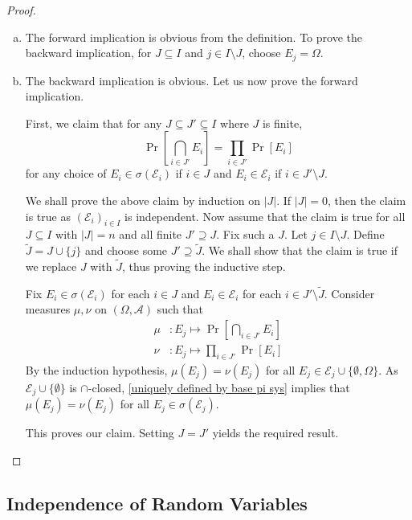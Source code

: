 \begin{proof}
    ~
    \begin{enumerate}[(a)]
        \item The forward implication is obvious from the definition. To prove the backward implication, for $J\subseteq I$ and $j\in I\setminus J$, choose $E_j=\Omega$.
        
        \item The backward implication is obvious. Let us now prove the forward implication.
        
        First, we claim that for any $J\subseteq J'\subseteq I$ where $J$ is finite, 
        $$\Pr\left[\bigcap_{i\in J'}E_i\right] = \prod_{i\in J'}\Pr[E_i]$$
        for any choice of $E_i\in\sigma(\mathcal{E}_i)$ if $i\in J$ and
        $E_i\in\mathcal{E}_i$ if $i\in J'\setminus J$.
        
        We shall prove the above claim by induction on $|J|$. If $|J|=0$, then the claim is true as $(\mathcal{E}_i)_{i\in I}$ is independent. Now assume that the claim is true for all $J\subseteq I$ with $|J|=n$ and all finite $J'\supseteq J$. Fix such a $J$. Let $j\in I\setminus J$. Define $\tilde J=J\cup\{j\}$ and choose some $J'\supseteq\tilde J$. We shall show that the claim is true if we replace $J$ with $\tilde J$, thus proving the inductive step.
    
        Fix $E_i\in\sigma(\mathcal{E}_i)$ for each $i\in J$ and $E_i\in\mathcal{E}_i$ for each $i\in J'\setminus\tilde J$. Consider measures $\mu,\nu$ on $(\Omega,\mathcal{A})$ such that
        \begin{align*}
            \mu &: E_j\mapsto \Pr\left[\bigcap_{i\in J'}E_i\right] \\
            \nu &: E_j\mapsto \prod_{i\in J'}\Pr[E_i]
        \end{align*}
        By the induction hypothesis, $\mu(E_j)=\nu(E_j)$ for all $E_j\in\mathcal{E}_j\cup\{\emptyset,\Omega\}$. As $\mathcal{E}_j\cup\{\emptyset\}$ is $\cap$-closed, \ref{uniquely defined by base pi sys} implies that $\mu(E_j)=\nu(E_j)$ for all $E_j\in\sigma(\mathcal{E}_j)$.
        
        This proves our claim. Setting $J=J'$ yields the required result.
    
    \end{enumerate}
\end{proof}

\subsection{Independence of Random Variables}

